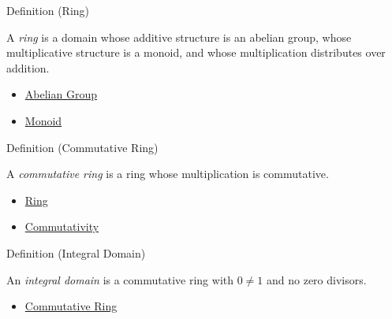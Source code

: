 \begin{definitionbox}{Definition (Ring)}
\begin{definition}[Ring]
\label{def:ring}
A \emph{ring} is a domain whose additive structure is an abelian group, whose
multiplicative structure is a monoid, and whose multiplication distributes
over addition.
\end{definition}
\end{definitionbox}

\begin{dependencies}
\begin{itemize}
  \item \hyperref[def:abelian-group]{Abelian Group}
  \item \hyperref[def:monoid]{Monoid}
\end{itemize}
\end{dependencies}

\begin{definitionbox}{Definition (Commutative Ring)}
\begin{definition}
\label{def:commutative-ring}
A \emph{commutative ring} is a ring whose multiplication is commutative.
\end{definition}
\end{definitionbox}

\begin{dependencies}
\begin{itemize}
  \item \hyperref[def:ring]{Ring}
  \item \hyperref[def:commutativity]{Commutativity}
\end{itemize}
\end{dependencies}

\begin{definitionbox}{Definition (Integral Domain)}
\begin{definition}
\label{def:abstract-integral-domain}
An \emph{integral domain} is a commutative ring with $0\ne1$ and no zero
divisors.
\end{definition}
\end{definitionbox}

\begin{dependencies}
\begin{itemize}
  \item \hyperref[def:commutative-ring]{Commutative Ring}
\end{itemize}
\end{dependencies}

